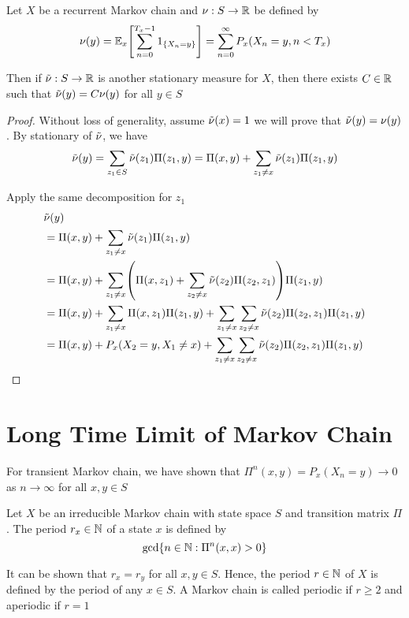 \documentclass{report}
\begin{document}
\begin{theorem}
    Let $X$ be a recurrent Markov chain and $\nu: S \to \mathbb{R}$ be defined by
    $$
        \nu(y) = \Exp_x\bracket*{\sum_{n=0}^{T_x - 1} 1_{\set{X_n = y}}} = \sum_{n=0}^\infty P_x(X_n=y, n < T_x)
    $$

    Then if $\Tilde{\nu}: S \to \mathbb{R}$ is another stationary measure for $X$, then there exists $C \in \mathbb{R}$ such that $\Tilde{\nu}(y) = C \nu(y)$ for all $y \in S$
\begin{proof}
    Without loss of generality, assume $\Tilde{\nu}(x) = 1$ we will prove that $\Tilde{\nu}(y) = \nu(y)$. By stationary of $\Tilde{\nu}$, we have
    $$
        \Tilde{\nu}(y) = \sum_{z_1 \in S} \Tilde{\nu}(z_1) \Pi(z_1, y) = \Pi(x, y) + \sum_{z_1 \neq x} \Tilde{\nu}(z_1) \Pi(z_1, y)
    $$

    Apply the same decomposition for $z_1$
    \begin{align*}
        &\Tilde{\nu}(y) \\
        &= \Pi(x, y) + \sum_{z_1 \neq x} \Tilde{\nu}(z_1) \Pi(z_1, y) \\
        &= \Pi(x, y) + \sum_{z_1 \neq x} \tuple*{\Pi(x, z_1) + \sum_{z_2 \neq x} \Tilde{\nu}(z_2) \Pi(z_2, z_1)} \Pi(z_1, y) \\
        &= \Pi(x, y) + \sum_{z_1 \neq x} \Pi(x, z_1) \Pi(z_1, y) + \sum_{z_1 \neq x} \sum_{z_2 \neq x} \Tilde{\nu}(z_2) \Pi(z_2, z_1) \Pi(z_1, y) \\
        &= \Pi(x, y) + P_x(X_2 = y, X_1 \neq x) + \sum_{z_1 \neq x} \sum_{z_2 \neq x} \Tilde{\nu}(z_2) \Pi(z_2, z_1) \Pi(z_1, y) \\
    \end{align*}

\end{proof}
\end{theorem}


\section{Long Time Limit of Markov Chain}

\begin{remark}
    For transient Markov chain, we have shown that $\Pi^n(x, y) = P_x(X_n = y) \to 0$ as $n \to \infty$ for all $x, y \in S$
\end{remark}

\begin{definition}
    Let $X$ be an irreducible Markov chain with state space $S$ and transition matrix $\Pi$. The period $r_x \in \mathbb{N}$ of a state $x$ is defined by
    $$
        \gcd \{n \in \mathbb{N}: \Pi^n(x, x) > 0\}
    $$

    It can be shown that $r_x = r_y$ for all $x, y \in S$. Hence, the period $r \in \mathbb{N}$ of $X$ is defined by the period of any $x \in S$. A Markov chain is called periodic if $r \geq 2$ and aperiodic if $r = 1$
\end{definition}
\end{document}
